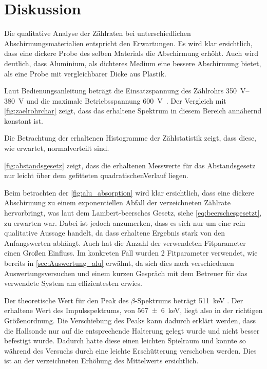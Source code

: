 \documentclass[12pt,english,ngerman]{scrartcl}
\begin{document}
\section{Diskussion}\label{sec:diskussion}

Die qualitative Analyse der Zählraten bei unterschiedlichen
Abschirmungsmaterialien entspricht den Erwartungen. Es wird klar ersichtlich,
dass eine dickere Probe des selben Materials die Abschirmung erhöht. Auch wird
deutlich, dass Aluminium, als dichteres Medium eine bessere Abschirmung bietet,
als eine Probe mit vergleichbarer Dicke aus Plastik.

Laut Bedienungsanleitung beträgt die Einsatzspannung des Zählrohrs
\SIrange{350}{380}{\volt} und die maximale Betriebsspannung
\SI{600}{\volt}~\cite{zaehlrohrdoku}. Der Vergleich mit
\autoref{fig:zaelrohrchar} zeigt, dass das erhaltene Spektrum in diesem Bereich
annähernd konstant ist.

Die Betrachtung der erhaltenen Histogramme der Zählstatistik zeigt, dass diese,
wie erwartet, normalverteilt sind.

\autoref{fig:abstandsgesetz} zeigt, dass die erhaltenen Messwerte für das Abstandsgesetz nur leicht über dem gefitteten
quadratischenVerlauf liegen.

Beim betrachten der \autoref{fig:alu_absorption} wird klar ersichtlich, dass
eine dickere Abschirmung zu einem exponentiellen Abfall der verzeichneten
Zählrate hervorbringt, was laut dem Lambert-beersches Gesetz, siehe
\autoref{eq:beerschesgesetzt}, zu erwarten war.
Dabei ist jedoch anzumerken, dass es sich nur um eine rein qualitative Aussage
handelt, da dass erhaltene Ergebnis stark von den Anfangswerten abhängt. Auch 
hat die Anzahl der verwendeten Fitparameter einen Großen Einfluss. Im konkreten Fall
wurden 2 Fitparameter verwendet, wie bereits in \autoref{sec:Auswertung_alu} erwähnt,
da sich dies nach verschiedenen Auswertungsversuchen und einem kurzen 
Gespräch mit dem Betreuer für das verwendete System am effizientesten erwies.


Der theoretische Wert für den Peak des $\beta$-Spektrums beträgt
\SI{511}{\kilo\electronvolt} \cite[]{leifi}. Der erhaltene Wert des
Impulsspektrums, von \SI{567(6)}{\kilo\electronvolt}, liegt also in der
richtigen Größenordnung. Die Verschiebung des Peaks kann dadurch erklärt
werden, dass die Hallsonde nur auf die entsprechende Halterung gelegt wurde und
nicht besser befestigt wurde. Dadurch hatte diese einen leichten Spielraum und
konnte so während des Versuchs durch eine leichte Erschütterung verschoben
werden. Dies ist an der verzeichneten Erhöhung des Mittelwerts ersichtlich.
\end{document}
